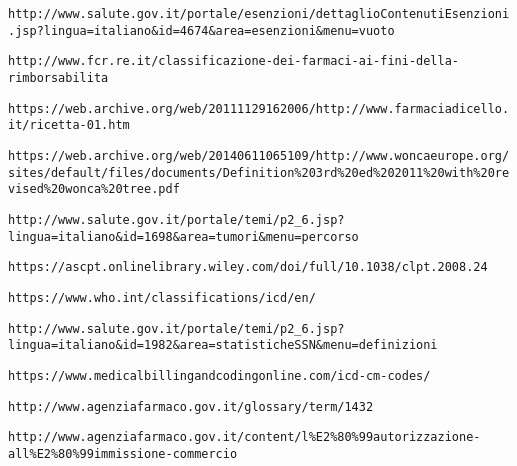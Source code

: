 \begin{thebibliography}{}
	\texttt{http://www.salute.gov.it/portale/esenzioni/dettaglioContenutiEsenzioni.jsp?lingua=italiano\&id=4674\&area=esenzioni\&menu=vuoto}
	
	\texttt{http://www.fcr.re.it/classificazione-dei-farmaci-ai-fini-della-rimborsabilita}
	
	\texttt{https://web.archive.org/web/20111129162006/http://www.farmaciadicello.it/ricetta-01.htm}
	
	\texttt{https://web.archive.org/web/20140611065109/http://www.woncaeurope.org/sites/default/files/documents/Definition\%203rd\%20ed\%202011\%20with\%20revised\%20wonca\%20tree.pdf}
	
	\texttt{http://www.salute.gov.it/portale/temi/p2\_6.jsp?lingua=italiano\&id=1698\&area=tumori\&menu=percorso}
	
	\texttt{https://ascpt.onlinelibrary.wiley.com/doi/full/10.1038/clpt.2008.24}
	
	\texttt{https://www.who.int/classifications/icd/en/}
	
	\texttt{http://www.salute.gov.it/portale/temi/p2\_6.jsp?lingua=italiano\&id=1982\&area=statisticheSSN\&menu=definizioni}
	
	\texttt{https://www.medicalbillingandcodingonline.com/icd-cm-codes/}
	
	\texttt{http://www.agenziafarmaco.gov.it/glossary/term/1432}
	
	\texttt{http://www.agenziafarmaco.gov.it/content/l\%E2\%80\%99autorizzazione-all\%E2\%80\%99immissione-commercio}
	
\end{thebibliography}
	